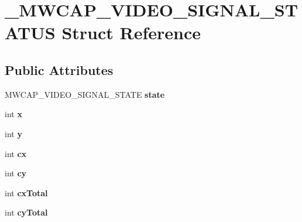 \hypertarget{struct__MWCAP__VIDEO__SIGNAL__STATUS}{\section{\-\_\-\-M\-W\-C\-A\-P\-\_\-\-V\-I\-D\-E\-O\-\_\-\-S\-I\-G\-N\-A\-L\-\_\-\-S\-T\-A\-T\-U\-S Struct Reference}
\label{struct__MWCAP__VIDEO__SIGNAL__STATUS}
}
\subsection*{Public Attributes}
\begin{DoxyCompactItemize}
\item 
\hypertarget{struct__MWCAP__VIDEO__SIGNAL__STATUS_a3c07a4d1e9d8ce76269b08f7cb0ce15d}{M\-W\-C\-A\-P\-\_\-\-V\-I\-D\-E\-O\-\_\-\-S\-I\-G\-N\-A\-L\-\_\-\-S\-T\-A\-T\-E {\bfseries state}}\label{struct__MWCAP__VIDEO__SIGNAL__STATUS_a3c07a4d1e9d8ce76269b08f7cb0ce15d}

\item 
\hypertarget{struct__MWCAP__VIDEO__SIGNAL__STATUS_a63c6e846ea626bac3af2a1d9ee04d754}{int {\bfseries x}}\label{struct__MWCAP__VIDEO__SIGNAL__STATUS_a63c6e846ea626bac3af2a1d9ee04d754}

\item 
\hypertarget{struct__MWCAP__VIDEO__SIGNAL__STATUS_a54cc9c8277b9d55cb355a8d81cfc27d7}{int {\bfseries y}}\label{struct__MWCAP__VIDEO__SIGNAL__STATUS_a54cc9c8277b9d55cb355a8d81cfc27d7}

\item 
\hypertarget{struct__MWCAP__VIDEO__SIGNAL__STATUS_ac68a4645307517623afc57d211fc704d}{int {\bfseries cx}}\label{struct__MWCAP__VIDEO__SIGNAL__STATUS_ac68a4645307517623afc57d211fc704d}

\item 
\hypertarget{struct__MWCAP__VIDEO__SIGNAL__STATUS_ac3295f84e8595cc869644d2a7be519c3}{int {\bfseries cy}}\label{struct__MWCAP__VIDEO__SIGNAL__STATUS_ac3295f84e8595cc869644d2a7be519c3}

\item 
\hypertarget{struct__MWCAP__VIDEO__SIGNAL__STATUS_ac8fa45fa9645b499a186c212bb342888}{int {\bfseries cx\-Total}}\label{struct__MWCAP__VIDEO__SIGNAL__STATUS_ac8fa45fa9645b499a186c212bb342888}

\item 
\hypertarget{struct__MWCAP__VIDEO__SIGNAL__STATUS_a906c0825bb521f6f1480027d797d0f85}{int {\bfseries cy\-Total}}\label{struct__MWCAP__VIDEO__SIGNAL__STATUS_a906c0825bb521f6f1480027d797d0f85}


\end{DoxyCompactItemize}
